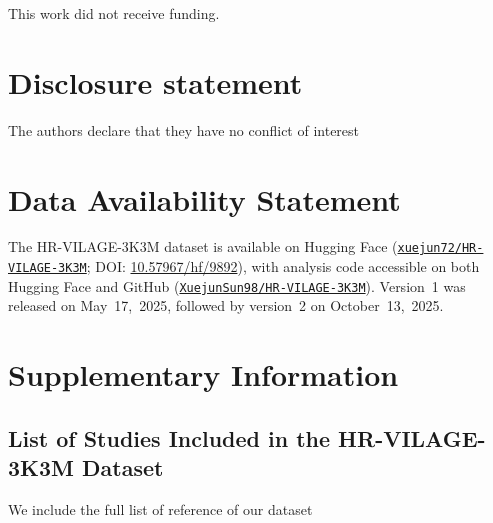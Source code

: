 \documentclass[
  12pt]{article}
\begin{document}
This work did not receive funding.

\section{Disclosure statement}\label{disclosure-statement}

The authors declare that they have no conflict of interest

\section{Data Availability Statement}\label{data-availability-statement}

The HR-VILAGE-3K3M dataset is available on Hugging Face (\href{https://huggingface.co/datasets/xuejun72/HR-VILAGE-3K3M}{\texttt{xuejun72/HR-VILAGE-3K3M}}; DOI: \href{https://doi.org/10.57967/hf/9892}{10.57967/hf/9892}), with analysis code accessible on both Hugging Face and GitHub (\href{https://github.com/XuejunSun98/HR-VILAGE-3K3M}{\texttt{XuejunSun98/HR-VILAGE-3K3M}}). Version~1 was released on May~17,~2025, followed by version~2 on October~13,~2025.

\clearpage
{}
\label{supplementary-material}

\section*{Supplementary Information}

\subsection{List of Studies Included in the HR-VILAGE-3K3M Dataset}
We include the full list of reference of our dataset~\citealp{lindeboom2024human,proud2008gene,davenport2015transcriptomic,muller2017development,habibi2020neutrophilic,liu2016individualized,zhai2015host,sparks2023influenza,jochems2018inflammation,nakaya2015systems,franco2013integrative,bucasas2011early,furman2013apoptosis,furman2014systems,furman2017expression,thakar2015aging,avey2020seasonal,tsang2014global,rinchai2022high,forst2022vaccination,odak2024systems,lee2022comprehensive,lee2022heterologous,lee2022mrna,lee2022prior,ryan2023systems,watanabe2023time,drury2024multi,grewe2024mva,chang2024altered,chang2024network,arunachalam2021systems,wimmers2021single,aydillo2022transcriptome,thwaites2023early,nakaya2011systems,cao2014differences,obermoser2013systems,narang2018influenza,monaco2019rna,carre2021endoplasmic,henn2013high,sarin2024impaired,huang2024interferon,ivanova2023mrna,kim2022germinal,lindeboom2023human,stephenson2024temporal,blazkova2017multicenter,alpert2019clinically,tomic2019fluprint}
\end{document}
